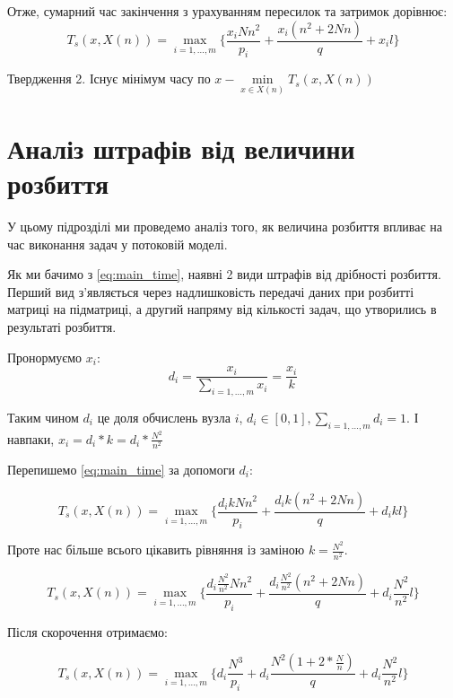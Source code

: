 Отже, сумарний час закінчення з урахуванням пересилок та затримок дорівнює:
\begin{equation}
	\label{eq:main_time}
	T_s(x,X(n)) = \max\limits_{i=1,\ldots,m} \bigg\{ \frac{x_i N n^2}{p_i} + \frac{x_i (n^2 + 2 N n )}{q} + x_i l \bigg\}
\end{equation}

Твердження 2. Існує мінімум часу по $x - \min\limits_{x \in X(n)} T_s(x, X(n))$

\section{Аналіз штрафів від величини розбиття}

У цьому підрозділі ми проведемо аналіз того, як величина розбиття впливає на час виконання задач у потоковій моделі.

Як ми бачимо з \ref{eq:main_time}, наявні 2 види штрафів від дрібності розбиття. Перший вид з'являється через надлишковість передачі даних при розбитті матриці на підматриці, а другий напряму від кількості задач, що утворились в результаті розбиття.

Пронормуємо $x_i$:
\begin{equation}
	\label{eq:d_i}
	d_i = \frac{x_i}{\sum\limits_{i=1,\ldots,m} x_i} = \frac{x_i}{k}
\end{equation}

Таким чином $d_i$ це доля обчислень вузла $i$, $d_i \in [0, 1], \sum\limits_{i=1,\ldots,m} d_i = 1$. І навпаки, $x_i = d_i * k = d_i * \frac{N^2}{n^2}$

Перепишемо \ref{eq:main_time} за допомоги $d_i$:

\begin{equation}
	\label{eq:main_time_d_i}
	T_s(x,X(n)) = \max\limits_{i=1,\ldots,m} \bigg\{ \frac{d_i k N n^2}{p_i} + \frac{d_i k(n^2 + 2 N n )}{q} + d_i k l \bigg\}
\end{equation}

Проте нас більше всього цікавить рівняння із заміною $k = \frac{N^2}{n^2}$.

\begin{equation}
\label{eq:main_time_d_i_2}
T_s(x,X(n)) = \max\limits_{i=1,\ldots,m} \bigg\{ \frac{d_i \frac{N^2}{n^2} N n^2}{p_i} + \frac{d_i \frac{N^2}{n^2}(n^2 + 2 N n )}{q} + d_i \frac{N^2}{n^2} l \bigg\}
\end{equation}

Після скорочення отримаємо:

\begin{equation}
\label{eq:main_time_d_i_final}
T_s(x,X(n)) = \max\limits_{i=1,\ldots,m} \bigg\{ d_i \frac{N^3}{p_i} + d_i \frac{N^2 ( 1 + 2*\frac{N}{n} )}{q} + d_i \frac{N^2}{n^2} l \bigg\}
\end{equation}

